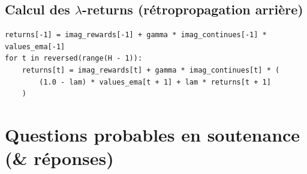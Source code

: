\documentclass[11pt,a4paper]{article}
\begin{document}
\subsection{Calcul des \(\lambda\)-returns (rétropropagation arrière)}
\begin{lstlisting}
returns[-1] = imag_rewards[-1] + gamma * imag_continues[-1] * values_ema[-1]
for t in reversed(range(H - 1)):
    returns[t] = imag_rewards[t] + gamma * imag_continues[t] * (
        (1.0 - lam) * values_ema[t + 1] + lam * returns[t + 1]
    )
\end{lstlisting}

\section{Questions probables en soutenance (\& réponses)}
\end{document}

